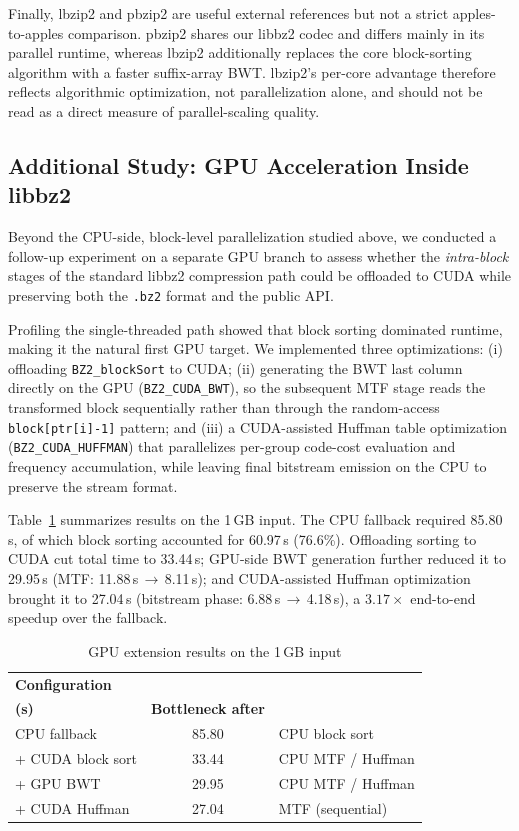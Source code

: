 \documentclass[conference]{IEEEtran}
\begin{document}
Finally, lbzip2 and pbzip2 are useful external references but not a strict apples-to-apples comparison. pbzip2 shares our libbz2 codec and differs mainly in its parallel runtime, whereas lbzip2 additionally replaces the core block-sorting algorithm with a faster suffix-array BWT. lbzip2's per-core advantage therefore reflects algorithmic optimization, not parallelization alone, and should not be read as a direct measure of parallel-scaling quality.

\subsection{Additional Study: GPU Acceleration Inside libbz2}
Beyond the CPU-side, block-level parallelization studied above, we conducted a follow-up experiment on a separate GPU branch to assess whether the \emph{intra-block} stages of the standard libbz2 compression path could be offloaded to CUDA while preserving both the \texttt{.bz2} format and the public API.

Profiling the single-threaded path showed that block sorting dominated runtime, making it the natural first GPU target. We implemented three optimizations: (i) offloading \texttt{BZ2\_blockSort} to CUDA; (ii) generating the BWT last column directly on the GPU (\texttt{BZ2\_CUDA\_BWT}), so the subsequent MTF stage reads the transformed block sequentially rather than through the random-access \texttt{block[ptr[i]-1]} pattern; and (iii) a CUDA-assisted Huffman table optimization (\texttt{BZ2\_CUDA\_HUFFMAN}) that parallelizes per-group code-cost evaluation and frequency accumulation, while leaving final bitstream emission on the CPU to preserve the stream format.

Table~\ref{tab:gpu} summarizes results on the 1\,GB input. The CPU fallback required 85.80\,s, of which block sorting accounted for 60.97\,s (76.6\%). Offloading sorting to CUDA cut total time to 33.44\,s; GPU-side BWT generation further reduced it to 29.95\,s (MTF: 11.88\,s\,$\rightarrow$\,8.11\,s); and CUDA-assisted Huffman optimization brought it to 27.04\,s (bitstream phase: 6.88\,s\,$\rightarrow$\,4.18\,s), a $3.17\times$ end-to-end speedup over the fallback.

\begin{table}[htbp]
\caption{GPU extension results on the 1\,GB input}
\label{tab:gpu}
\centering
\begin{tabular}{lcl}
\hline
\textbf{Configuration} & \shortstack{\textbf{Time} \\ \textbf{(s)}} & \textbf{Bottleneck after} \\ \hline
CPU fallback                & 85.80 & CPU block sort \\
+ CUDA block sort           & 33.44 & CPU MTF / Huffman \\
+ GPU BWT                   & 29.95 & CPU MTF / Huffman \\
+ CUDA Huffman              & 27.04 & MTF (sequential) \\ \hline
\end{tabular}
\end{table}
\end{document}
